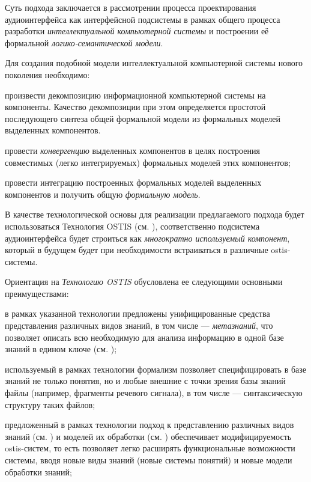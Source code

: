 Суть подхода заключается в рассмотрении процесса проектирования аудиоинтерфейса как интерфейсной подсистемы в рамках общего процесса разработки \textit{интеллектуальной компьютерной системы} и построении её формальной \textit{логико-семантической модели}.

Для создания подобной модели интеллектуальной компьютерной системы нового поколения необходимо:
\begin{textitemize}    
    \item произвести декомпозицию информационной компьютерной системы на компоненты. Качество декомпозиции при этом определяется простотой последующего синтеза общей формальной модели из формальных моделей выделенных компонентов.
    \item провести \textit{конвергенцию} выделенных компонентов в целях построения совместимых (легко интегрируемых) формальных моделей этих компонентов;
    \item провести интеграцию построенных формальных моделей выделенных компонентов и получить общую \textit{формальную модель}.
\end{textitemize}

В качестве технологической основы для реализации предлагаемого подхода будет использоваться Технология OSTIS (см. ), соответственно подсистема аудиоинтерфейса будет строиться как \textit{многократно используемый компонент}, который в будущем будет при необходимости встраиваться в различные ostis-системы.

Ориентация на \textit{Технологию OSTIS} обусловлена ее следующими основными преимуществами:
\begin{textitemize}
\item в рамках указанной технологии предложены унифицированные средства представления различных видов знаний, в том числе --- \textit{метазнаний}, что позволяет описать всю необходимую для анализа информацию в одной базе знаний в едином ключе (см. );
\item используемый в рамках технологии формализм позволяет специфицировать в базе знаний не только понятия, но и любые внешние с точки зрения базы знаний файлы (например, фрагменты речевого сигнала), в том числе --- синтаксическую структуру таких файлов;
\item предложенный в рамках технологии подход к представлению различных видов знаний (см. ) и моделей их обработки (см. ) обеспечивает модифицируемость ostis-систем, то есть позволяет легко расширять функциональные возможности системы, вводя новые виды знаний (новые системы понятий) и новые модели обработки знаний;
\end{textitemize}

